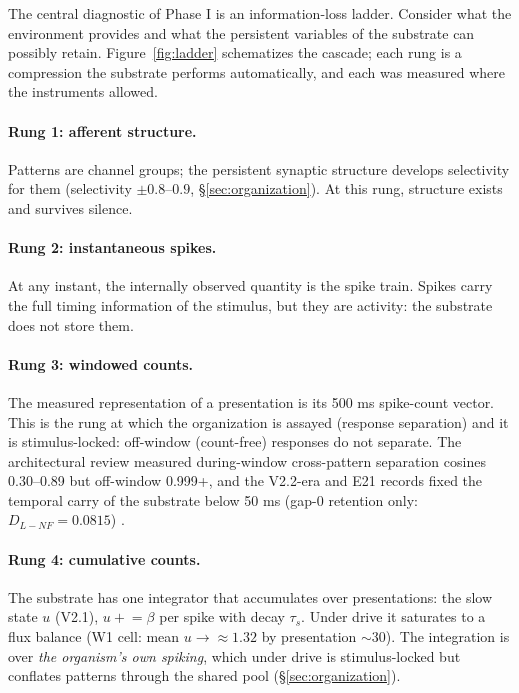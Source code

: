 The central diagnostic of Phase I is an information-loss ladder.
Consider what the environment provides and what the persistent variables
of the substrate can possibly retain. Figure~\ref{fig:ladder}
schematizes the cascade; each rung is a compression the substrate
performs automatically, and each was measured where the instruments
allowed.

\paragraph{Rung 1: afferent structure.}
Patterns are channel groups; the persistent synaptic structure develops
selectivity for them (selectivity \(\pm 0.8\)--\(0.9\),
\S\ref{sec:organization}). At this rung, structure exists and survives
silence.

\paragraph{Rung 2: instantaneous spikes.}
At any instant, the internally observed quantity is the spike train.
Spikes carry the full timing information of the stimulus, but they are
activity: the substrate does not store them.

\paragraph{Rung 3: windowed counts.}
The measured representation of a presentation is its 500 ms spike-count
vector. This is the rung at which the organization is assayed
(response separation) and it is stimulus-locked: off-window
(count-free) responses do not separate. The architectural review
measured during-window cross-pattern separation cosines 0.30--0.89 but
off-window 0.999+, and the V2.2-era and E21 records fixed the temporal
carry of the substrate below 50 ms (gap-0 retention only:
\(D_{L{-}NF}=0.0815\)) \cite{overview}.

\paragraph{Rung 4: cumulative counts.}
The substrate has one integrator that accumulates over presentations:
the slow state \(u\) (V2.1), \(u \mathrel{+}= \beta\) per spike with
decay \(\tau_s\). Under drive it saturates to a flux balance (W1 cell:
mean \(u \to \approx 1.32\) by presentation \(\sim\)30). The
integration is over \emph{the organism's own spiking}, which under
drive is stimulus-locked but conflates patterns through the shared
pool (\S\ref{sec:organization}).

